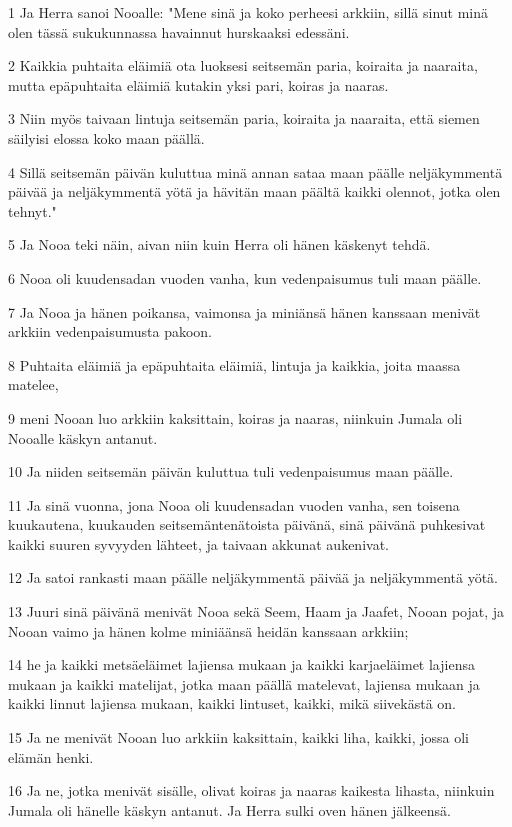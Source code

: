 \par 1 Ja Herra sanoi Nooalle: "Mene sinä ja koko perheesi arkkiin, sillä sinut minä olen tässä sukukunnassa havainnut hurskaaksi edessäni.
\par 2 Kaikkia puhtaita eläimiä ota luoksesi seitsemän paria, koiraita ja naaraita, mutta epäpuhtaita eläimiä kutakin yksi pari, koiras ja naaras.
\par 3 Niin myös taivaan lintuja seitsemän paria, koiraita ja naaraita, että siemen säilyisi elossa koko maan päällä.
\par 4 Sillä seitsemän päivän kuluttua minä annan sataa maan päälle neljäkymmentä päivää ja neljäkymmentä yötä ja hävitän maan päältä kaikki olennot, jotka olen tehnyt."
\par 5 Ja Nooa teki näin, aivan niin kuin Herra oli hänen käskenyt tehdä.
\par 6 Nooa oli kuudensadan vuoden vanha, kun vedenpaisumus tuli maan päälle.
\par 7 Ja Nooa ja hänen poikansa, vaimonsa ja miniänsä hänen kanssaan menivät arkkiin vedenpaisumusta pakoon.
\par 8 Puhtaita eläimiä ja epäpuhtaita eläimiä, lintuja ja kaikkia, joita maassa matelee,
\par 9 meni Nooan luo arkkiin kaksittain, koiras ja naaras, niinkuin Jumala oli Nooalle käskyn antanut.
\par 10 Ja niiden seitsemän päivän kuluttua tuli vedenpaisumus maan päälle.
\par 11 Ja sinä vuonna, jona Nooa oli kuudensadan vuoden vanha, sen toisena kuukautena, kuukauden seitsemäntenätoista päivänä, sinä päivänä puhkesivat kaikki suuren syvyyden lähteet, ja taivaan akkunat aukenivat.
\par 12 Ja satoi rankasti maan päälle neljäkymmentä päivää ja neljäkymmentä yötä.
\par 13 Juuri sinä päivänä menivät Nooa sekä Seem, Haam ja Jaafet, Nooan pojat, ja Nooan vaimo ja hänen kolme miniäänsä heidän kanssaan arkkiin;
\par 14 he ja kaikki metsäeläimet lajiensa mukaan ja kaikki karjaeläimet lajiensa mukaan ja kaikki matelijat, jotka maan päällä matelevat, lajiensa mukaan ja kaikki linnut lajiensa mukaan, kaikki lintuset, kaikki, mikä siivekästä on.
\par 15 Ja ne menivät Nooan luo arkkiin kaksittain, kaikki liha, kaikki, jossa oli elämän henki.
\par 16 Ja ne, jotka menivät sisälle, olivat koiras ja naaras kaikesta lihasta, niinkuin Jumala oli hänelle käskyn antanut. Ja Herra sulki oven hänen jälkeensä.
